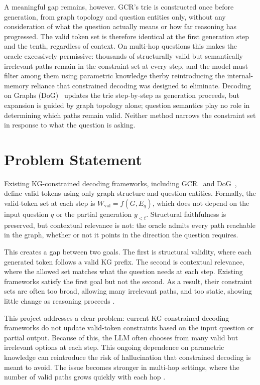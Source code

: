 A meaningful gap remains, however. GCR's trie is constructed once before generation, from graph topology and question entities only, without any consideration of what the question actually means or how far reasoning has progressed. The valid token set is therefore identical at the first generation step and the tenth, regardless of context. On multi-hop questions this makes the oracle excessively permissive: thousands of structurally valid but semantically irrelevant paths remain in the constraint set at every step, and the model must filter among them using parametric knowledge therby reintroducing the internal-memory reliance that constrained decoding was designed to eliminate. Decoding on Graphs (DoG)~\citep{li2024-decoding-on-graphs} updates the trie step-by-step as generation proceeds, but expansion is guided by graph topology alone; question semantics play no role in determining which paths remain valid. Neither method narrows the constraint set in response to what the question is asking.

\section{Problem Statement}

Existing KG-constrained decoding frameworks, including GCR~\citep{luo2025-graph-constrained-reasoning} and DoG~\citep{li2024-decoding-on-graphs}, define valid tokens using only graph structure and question entities. Formally, the valid-token set at each step is $W_{\mathrm{val}} = f(G, E_q)$, which does not depend on the input question $q$ or the partial generation $y_{<t}$. Structural faithfulness is preserved, but contextual relevance is not: the oracle admits every path reachable in the graph, whether or not it points in the direction the question requires.

This creates a gap between two goals. The first is structural validity, where each generated token follows a valid KG prefix. The second is contextual relevance, where the allowed set matches what the question needs at each step. Existing frameworks satisfy the first goal but not the second. As a result, their constraint sets are often too broad, allowing many irrelevant paths, and too static, showing little change as reasoning proceeds \citep{li2024-decoding-on-graphs,luo2025-graph-constrained-reasoning}.

This project addresses a clear problem: current KG-constrained decoding frameworks do not update valid-token constraints based on the input question or partial output. Because of this, the LLM often chooses from many valid but irrelevant options at each step. This ongoing dependence on parametric knowledge can reintroduce the risk of hallucination that constrained decoding is meant to avoid. The issue becomes stronger in multi-hop settings, where the number of valid paths grows quickly with each hop \citep{lan2022survey,he2021improving,talmor2018cwq}.

